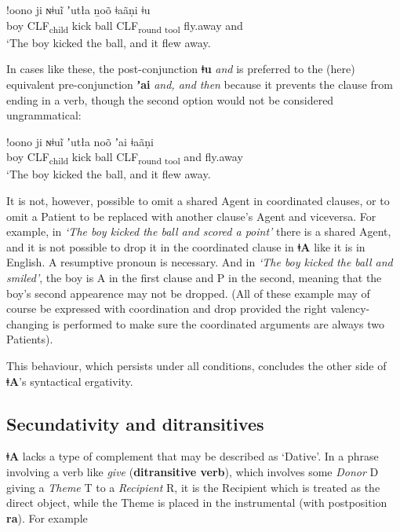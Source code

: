 \documentclass[11pt,a5paper]{book}
\newcommand{\qcn}[1]{\textcolor{AccentText}{\large\textbf{#1}}}
\newcommand{\langname}{\qcn{ǂA}}
\newcommand{\transl}[2]{\qcn{#1} \emph{#2}}
\newcommand{\grammsc}[1]{\textsc{#1}}
\newcommand{\CLF}[1]{\grammsc{CLF}\textsubscript{#1}}
\begin{document}
\begin{exe}
\ex
\gll !oono 	ji 	ɴǂuĩ 	 	ʼutła 	ṉoõ  ǂaãṇi ǂu\\
boy 	\CLF{child} 	kick 	ball 	\CLF{round tool} 	fly.away  and\\
\glt `The boy kicked the ball, and it flew away.
\end{exe}

In cases like these, the post-conjunction \transl{ǂu}{and} is preferred to the (here) equivalent pre-conjunction \transl{ʼai}{and, and then} because it prevents the clause from ending in a verb, though the second option would not be considered ungrammatical:

\begin{exe}
\ex
\gll !oono 	ji 	ɴǂuĩ 	 	ʼutła 	noõ  ʼai ǂaãṇi \\
boy 	\CLF{child} 	kick 	ball 	\CLF{round tool}   and	fly.away  \\
\glt `The boy kicked the ball, and it flew away.
\end{exe}

It is not, however, possible to omit a shared Agent in coordinated clauses, or to omit a Patient to be replaced with another clause's Agent and viceversa. For example, in \emph{`The boy kicked the ball and scored a point'} there is a shared Agent, and it is not possible to drop it in the coordinated clause in \langname{} like it is in English. A resumptive pronoun is necessary. And in \emph{`The boy kicked the ball and smiled'}, the boy is A in the first clause and P in the second, meaning that the boy's second appearence may not be dropped. (All of these example may of course be expressed with coordination and drop provided the right valency-changing is performed to make sure the coordinated arguments are always two Patients).

This behaviour, which persists under all conditions, concludes the other side of \langname's syntactical ergativity.

\subsection{Secundativity and ditransitives}

\langname{} lacks a type of complement that may be described as `Dative'. In a phrase involving a verb like \emph{give} (\textbf{ditransitive verb}), which involves some \emph{Donor} D giving a \emph{Theme} T to a \emph{Recipient} R, it is the Recipient which is treated as the direct object, while the Theme is placed in the instrumental (with postposition \qcn{ra}). For example
\end{document}

